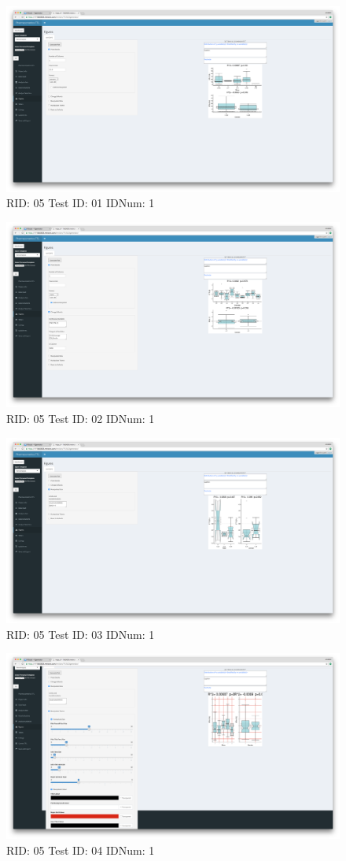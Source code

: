 \begin{figure}[H]
\includegraphics[width=.8\textwidth]{screencaps/05-01-1.png}
\caption{RID: 05 Test ID: 01 IDNum: 1}
\end{figure}
\begin{figure}[H]
\includegraphics[width=.8\textwidth]{screencaps/05-02-1.png}
\caption{RID: 05 Test ID: 02 IDNum: 1}
\end{figure}
\begin{figure}[H]
\includegraphics[width=.8\textwidth]{screencaps/05-03-1.png}
\caption{RID: 05 Test ID: 03 IDNum: 1}
\end{figure}
\begin{figure}[H]
\includegraphics[width=.8\textwidth]{screencaps/05-04-1.png}
\caption{RID: 05 Test ID: 04 IDNum: 1}
\end{figure}
